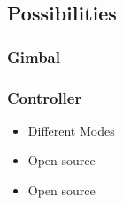 \subsection{Possibilities}

\begin{frame}
\frametitle{Gimbal}

  
\end{frame}


\begin{frame}
\frametitle{Controller}

  \begin{itemize}
    \item Different Modes
    \item Open source
    \item Open source
    
  \end{itemize}
    
\end{frame}